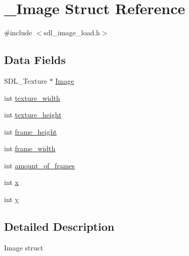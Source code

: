 \hypertarget{struct___image}{\section{\+\_\+\+Image Struct Reference}
\label{struct___image}
}


{\ttfamily \#include $<$sdl\+\_\+image\+\_\+load.\+h$>$}

\subsection*{Data Fields}
\begin{DoxyCompactItemize}
\item 
S\+D\+L\+\_\+\+Texture $\ast$ \hyperlink{struct___image_a97b32deb280734d771eb91b82a2251a3}{Image}
\item 
int \hyperlink{struct___image_ae4f71de45f0a2263d14930dcf8691f5d}{texture\+\_\+width}
\item 
int \hyperlink{struct___image_a22e910452b37a1bcd9b35c927236af20}{texture\+\_\+height}
\item 
int \hyperlink{struct___image_ac2614f43e36df461d5e4729be3ad04b4}{frame\+\_\+height}
\item 
int \hyperlink{struct___image_a4f1bbe063dc390226d56e9eb79afc663}{frame\+\_\+width}
\item 
int \hyperlink{struct___image_a2a2e85b75bd743d491247027f5ff7a21}{amount\+\_\+of\+\_\+frames}
\item 
int \hyperlink{struct___image_a6150e0515f7202e2fb518f7206ed97dc}{x}
\item 
int \hyperlink{struct___image_a0a2f84ed7838f07779ae24c5a9086d33}{y}
\end{DoxyCompactItemize}


\subsection{Detailed Description}
Image struct 

